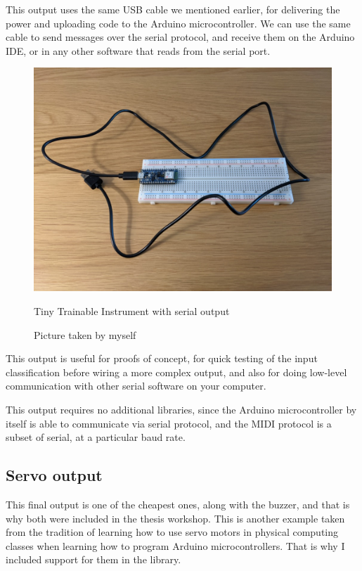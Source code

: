 This output uses the same USB cable we mentioned earlier, for delivering the power and uploading code to the Arduino microcontroller. We can use the same cable to send messages over the serial protocol, and receive them on the Arduino IDE, or in any other software that reads from the serial port.
\begin{figure}[ht]

  \centering
  \includegraphics[width=0.75\linewidth,height=0.25\textheight,keepaspectratio]{images/output-serial.jpg}
  \caption{Tiny Trainable Instrument with serial output}
  \caption*{Picture taken by myself}
  \label{fig:output-serial}
\end{figure}

This output is useful for proofs of concept, for quick testing of the input classification before wiring a more complex output, and also for doing low-level communication with other serial software on your computer. 

This output requires no additional libraries, since the Arduino microcontroller by itself is able to communicate via serial protocol, and the MIDI protocol is a subset of serial, at a particular baud rate.

\subsection{Servo output}

This final output is one of the cheapest ones, along with the buzzer, and that is why both were included in the thesis workshop. This is another example taken from the tradition of learning how to use servo motors in physical computing classes when learning how to program Arduino microcontrollers. That is why I included support for them in the library.

